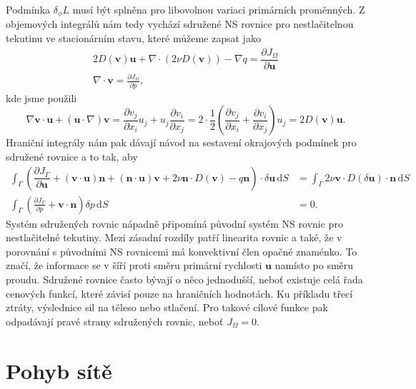 Podmínka $ \delta_\phi L $ musí být splněna pro libovolnou variaci primárních proměnných. Z objemových integrálů nám tedy vychází sdružené NS rovnice pro nestlačitelnou tekutinu ve stacionárním stavu, které můžeme zapsat jako
\begin{align}
2D(\mathbf{v})\mathbf{u}
+ \nabla \cdot \left( 2\nu D(\mathbf{v}) \right)
- \nabla q 
=
\dfrac{\partial J_{\Omega}}{\partial \mathbf{u}} 
\\
\nabla \cdot \mathbf{v} 
= 
\frac{\partial J_\Omega}{\partial p},
\end{align}
kde jsme použili  
\begin{equation*}
\nabla \mathbf{v}\cdot \mathbf{u}
+ (\mathbf{u} \cdot \nabla)\mathbf{v} 
=
\frac{\partial v_j}{\partial x_i}  u_j + u_j  \frac{\partial v_i}{\partial x_j} 
=
2\cdot\frac{1}{2}
\left(
\frac{\partial v_j}{\partial x_i}
+ \frac{\partial v_i}{\partial x_j} 
\right)
u_j
=
2D(\mathbf{v})\mathbf{u}.
\end{equation*}
Hraniční integrály nám pak dávají návod na sestavení okrajových podmínek pro sdružené rovnice a to tak, aby
\begin{align}
\label{eq:sdruzenaOP1}
\int_{\Gamma}
\left(
\dfrac{\partial J_{\Gamma}}{\partial \mathbf{u}}
+ (\mathbf{v}\cdot \mathbf{u} )\mathbf{n} 
+ (\mathbf{n} \cdot \mathbf{u}) \mathbf{v}
+ 2\nu \mathbf{n} \cdot  D(\mathbf{v})
- q \mathbf{n}
\right)
\cdot \delta \mathbf{u}
\, \mathrm{d}S
&= 
\int_{\Gamma} 
2\nu \mathbf{v} \cdot  D(\delta \mathbf{u})\cdot \mathbf{n}
\, \mathrm{d}S
\\
\label{eq:sdruzenaOP2}
\int_{\Gamma}
\left(
\frac{\partial J_\Gamma}{\partial p}
+ \mathbf{v} \cdot \mathbf{n}
\right)
\delta p
\, \mathrm{d}S
&= 0.
\end{align}
Systém sdružených rovnic nápadně připomíná původní systém NS rovnic pro nestlačitelné tekutiny. Mezi zásadní rozdíly patří linearita rovnic a také, že v porovnání s původními NS rovnicemi má konvektivní člen opačné znaménko. To značí, že informace se v šíří proti směru primární rychlosti $ \mathbf{u} $ namísto po směru proudu. Sdružené rovnice často bývají o něco jednodušší, neboť existuje celá řada cenových funkcí, které závisí pouze na hraničních hodnotách. Ku příkladu třecí ztráty, výslednice sil na těleso nebo stlačení. Pro takové cílové funkce pak odpadávají pravé strany sdružených rovnic, neboť $ J_\Omega = 0 $.


\section{Pohyb sítě}

